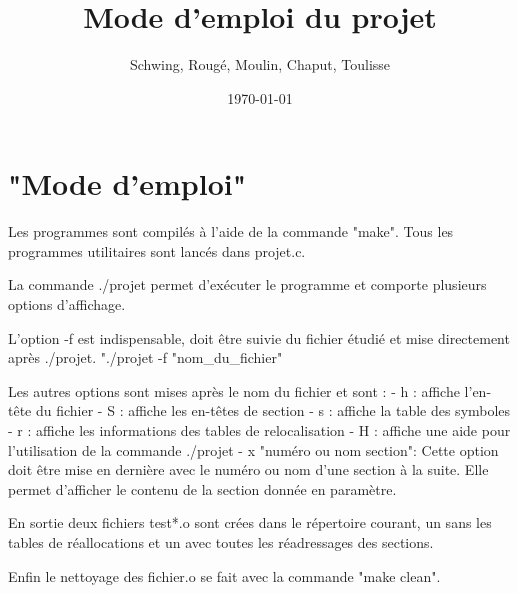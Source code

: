 \documentclass[12pt, a4paper]{article}
\title{Mode d'emploi du projet}
\author{Schwing, Roug\'e, Moulin, Chaput, Toulisse}
\date{\today}
\begin{document}
\maketitle

\section{"Mode d'emploi"}

Les programmes sont compilés à l'aide de la commande "make".
Tous les programmes utilitaires sont lancés dans projet.c.
		
La commande ./projet permet d'exécuter le programme et comporte plusieurs options d'affichage.

L'option -f est indispensable, doit être suivie du fichier étudié et mise directement après ./projet.	
"./projet -f "nom_du_fichier"

Les autres options sont mises après le nom du fichier et sont :
		- h : affiche l'en-tête du fichier
		- S : affiche les en-têtes de section
		- s : affiche la table des symboles
		- r : affiche les informations des tables de relocalisation
		- H : affiche une aide pour l'utilisation de la commande ./projet
		- x "numéro ou nom section": Cette option doit être mise en dernière avec le numéro ou nom d'une section à la suite.
					Elle permet d'afficher le contenu de la section donnée en paramètre.

En sortie deux fichiers test*.o sont crées dans le répertoire courant, un sans les tables de réallocations et un avec toutes les réadressages des sections.

Enfin le nettoyage des fichier.o se fait avec la commande "make clean".
\end{document}
